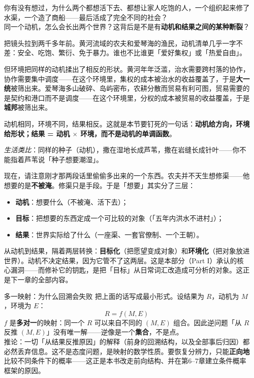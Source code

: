 \documentclass[../../main2.tex]{subfiles}
\begin{document}
	\begin{readingnote}
		你有没有想过，为什么两个都想活下去、都想让家人吃饱的人，一个组织起来修了水渠，一个造了商船——最后活成了完全不同的社会？\\
		同一个动机，怎么会长出两个世界？这背后是不是有\textbf{动机和结果之间的某种断裂}？
	\end{readingnote}

	把镜头拉到两千多年前。黄河流域的农夫和爱琴海的渔民，动机清单几乎一字不差：安全、吃饱、繁衍、免于暴力。谁也不比谁更「爱好集权」或「热爱自由」。

	但环境把同样的动机揉出了相反的形状。黄河年年泛滥，治水需要跨村落的协作，协作需要集中调度——在这个环境里，集权的成本被治水的收益覆盖了，于是\textbf{大一统}被筛出来。爱琴海多山破碎、岛屿密布，农耕分散而贸易有利可图，贸易需要的是契约和港口而不是调度——在这个环境里，分权的成本被贸易的收益覆盖，于是\textbf{城邦}被筛出来。

	动机相同，环境不同，结果相反。这就是本节要钉死的一句话：\textbf{动机给方向，环境给形状；结果 = 动机 $\times$ 环境，而不是动机的单调函数}。

	\textit{生活类比}：同样的种子（动机），撒在湿地长成芦苇，撒在岩缝长成针叶——你不能指着芦苇说「种子想要潮湿」。

	现在，请注意刚才那两段话里偷偷多出来的一个东西。农夫并不天生想修渠——他想要的是\textbf{不被淹}。修渠只是手段。于是「想要」其实分了三层：
	\begin{itemize}
		\item \textbf{动机}：想要什么（不被淹、活下去）；
		\item \textbf{目标}：把想要的东西定成一个可比较的对象（「五年内洪水不进村」）；
		\item \textbf{结果}：世界实际给了什么（一座渠、一套官僚制、一个王朝）。
	\end{itemize}

	从动机到结果，隔着两层转换：\textbf{目标化}（把愿望变成对象）和\textbf{环境化}（把对象放进世界）。动机不决定结果，因为它管不了这两层。这是本部分（Part I）承认的核心漏洞——而修补它的钥匙，是把「目标」从日常词汇改造成可分析的对象。这正是下一章的全部内容。

	\begin{mathbox}{多一映射：为什么回溯会失败}
		把上面的话写成最小形式。设结果为 $R$，动机为 $M$，环境为 $E$：
		\[ R = f(M, E) \]
		$f$ 是\textbf{多对一}的映射：同一个 $R$ 可以来自不同的 $(M, E)$ 组合。因此逆问题「从 $R$ 反推 $(M, E)$」没有唯一解——逆像是一个\textbf{集合}，不是点。\\[0.4em]
		推论：一切「从结果反推原因」的解释（前身的回溯结构，以及全部事后归因）都必然丢弃信息。这不是态度问题，是映射的数学性质。要恢复分辨力，只能\textbf{正向地}比较不同条件下的概率——这正是本书改走前向结构、并在第6--7章建立条件概率框架的原因。
	\end{mathbox}
\end{document}
